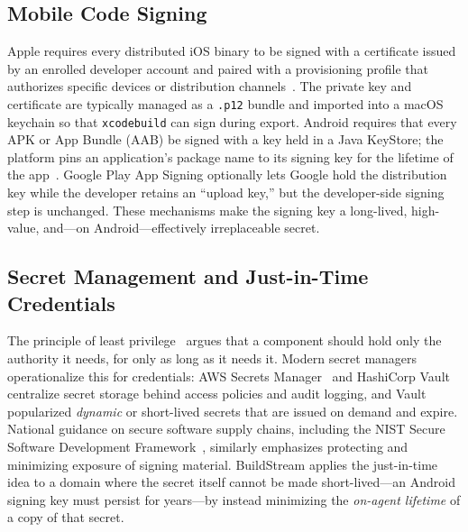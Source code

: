 \documentclass[conference]{IEEEtran}
\begin{document}
\subsection{Mobile Code Signing}
Apple requires every distributed iOS binary to be signed with a certificate
issued by an enrolled developer account and paired with a provisioning profile
that authorizes specific devices or distribution channels~\cite{applesign}. The
private key and certificate are typically managed as a \texttt{.p12} bundle and
imported into a macOS keychain so that \texttt{xcodebuild} can sign during
export. Android requires that every APK or App Bundle (AAB) be signed with a key
held in a Java KeyStore; the platform pins an application's package name to its
signing key for the lifetime of the app~\cite{androidsign}. Google Play App
Signing optionally lets Google hold the distribution key while the developer
retains an ``upload key,'' but the developer-side signing step is unchanged.
These mechanisms make the signing key a long-lived, high-value, and---on
Android---effectively irreplaceable secret.

\subsection{Secret Management and Just-in-Time Credentials}
The principle of least privilege~\cite{saltzer} argues that a component should
hold only the authority it needs, for only as long as it needs it. Modern secret
managers operationalize this for credentials: AWS Secrets
Manager~\cite{awssm} and HashiCorp Vault~\cite{vault} centralize secret storage
behind access policies and audit logging, and Vault popularized \emph{dynamic}
or short-lived secrets that are issued on demand and expire. National guidance on
secure software supply chains, including the NIST Secure Software Development
Framework~\cite{nistssdf}, similarly emphasizes protecting and minimizing
exposure of signing material. BuildStream applies the just-in-time idea to a
domain where the secret itself cannot be made short-lived---an Android signing
key must persist for years---by instead minimizing the \emph{on-agent lifetime}
of a copy of that secret.
\end{document}
